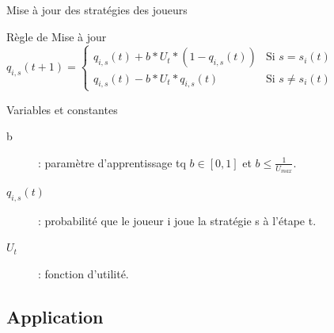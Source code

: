 \begin{frame}{Mise à jour des stratégies des joueurs}
    \begin{block}{Règle de Mise à jour}
    $q_{i,s}(t+1)= \left\{\begin{array}{ll}
        q_{i,s}(t) + b * U_{t} * (1 - q_{i,s}(t))& \mbox{Si } s = s_i(t) \\
         q_{i,s}(t) - b * U_{t} * q_{i,s}(t) & \mbox{Si } s \neq s_i(t)
    \end{array}
\right.$
    \end{block}
    \begin{exampleblock}{Variables et constantes}
    \begin{description}
    \item[b] : paramètre d'apprentissage tq $b \in [0,1]$ et $b\leq \frac{1}{U_{max}}$.
    \item[$q_{i,s}(t)$] : probabilité que le joueur i joue la stratégie s à l'étape t.
    \item[$U_t$] : fonction d'utilité. %
    \end{description}
    \end{exampleblock}
\end{frame}


\subsection{Application}

